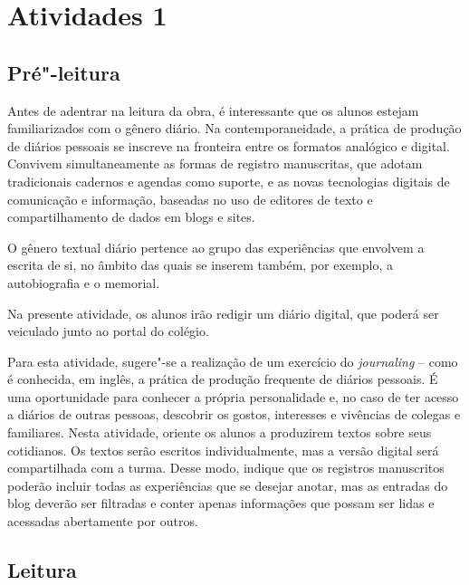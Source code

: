 \documentclass[12pt]{extarticle}
\begin{document}
\tableofcontents

	
\section{Atividades 1}


\subsection{Pré"-leitura}


Antes de adentrar na leitura da obra, é interessante que os
alunos estejam familiarizados com o gênero diário. Na contemporaneidade,
a prática de produção de diários pessoais se inscreve na fronteira entre
os formatos analógico e digital. Convivem simultaneamente as formas de
registro manuscritas, que adotam tradicionais cadernos e agendas como
suporte, e as novas tecnologias digitais de comunicação e informação,
baseadas no uso de editores de texto e compartilhamento de dados em
blogs e sites.

O gênero textual diário pertence ao grupo das experiências que envolvem
a escrita de si, no âmbito das quais se inserem também, por exemplo, a
autobiografia e o memorial.

Na presente atividade, os alunos irão redigir um diário digital, que
poderá ser veiculado junto ao portal do colégio.

Para esta atividade, sugere"-se a realização de um exercício do
\emph{journaling} -- como é conhecida, em inglês, a prática de produção
frequente de diários pessoais. É uma oportunidade para conhecer a
própria personalidade e, no caso de ter acesso a diários de outras
pessoas, descobrir os gostos, interesses e vivências de colegas e
familiares. Nesta atividade, oriente os alunos a produzirem textos sobre
seus cotidianos. Os textos serão escritos individualmente, mas a versão
digital será compartilhada com a turma. Desse modo, indique que os
registros manuscritos poderão incluir todas as experiências que se
desejar anotar, mas as entradas do blog deverão ser filtradas e conter
apenas informações que possam ser lidas e acessadas abertamente por
outros.

\subsection{Leitura}
\end{document}
